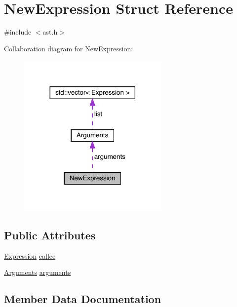 \hypertarget{struct_new_expression}{}\section{New\+Expression Struct Reference}
\label{struct_new_expression}


{\ttfamily \#include $<$ast.\+h$>$}



Collaboration diagram for New\+Expression\+:\nopagebreak
\begin{figure}[H]
\begin{center}
\leavevmode
\includegraphics[width=209pt]{struct_new_expression__coll__graph}
\end{center}
\end{figure}
\subsection*{Public Attributes}
\begin{DoxyCompactItemize}
\item 
\hyperlink{ast_8h_a4cb273a4d960cd13ea17d08f254493e8}{Expression} \hyperlink{struct_new_expression_a4079a15c0800a41cffcf5e408578d2a0}{callee}
\item 
\hyperlink{struct_arguments}{Arguments} \hyperlink{struct_new_expression_aaa8f24c1528ce8900e4aabca7a95f3b6}{arguments}
\end{DoxyCompactItemize}


\subsection{Member Data Documentation}
\mbox{\label{struct_new_expression_aaa8f24c1528ce8900e4aabca7a95f3b6}} 
